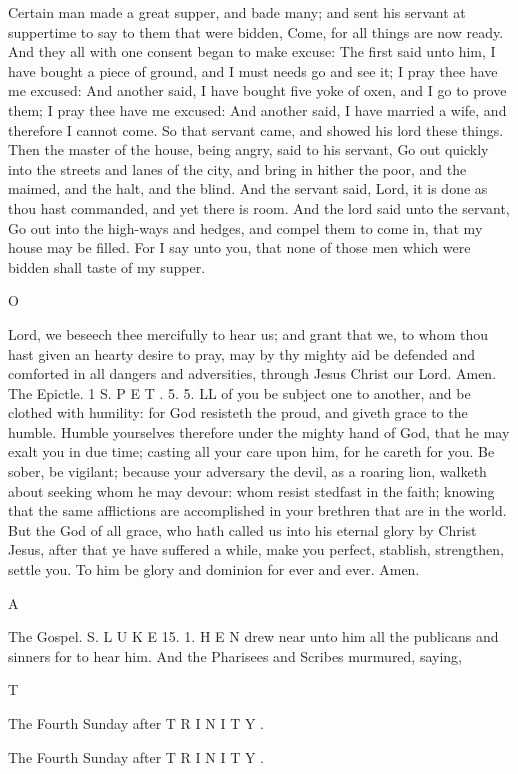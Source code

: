 Certain man made a great supper, and bade many; and sent his servant at suppertime to say to them that were bidden, Come, for all things are now ready. And they all with one consent began to make excuse: The first said unto him, I have bought a piece of ground, and I must needs go and see it; I pray thee have me excused: And another said, I have bought five yoke of oxen, and I go to prove them; I pray thee have me excused: And another said, I have married a wife, and therefore I cannot come. So that servant came, and showed his lord these things. Then the master of the house, being angry, said to his servant, Go out quickly into the streets and lanes of the city, and bring in hither the poor, and the maimed, and the halt, and the blind. And the servant said, Lord, it is done as thou hast commanded, and yet there is room. And the lord said unto the servant, Go out into the high-ways and hedges, and compel them to come in, that my house may be filled. For I say unto you, that none of those men which were bidden shall taste of my supper.

O

Lord, we beseech thee mercifully to hear us; and grant that we, to whom thou hast given an hearty desire to pray, may by thy mighty aid be defended and comforted in all dangers and adversities, through Jesus Christ our Lord. Amen. The Epictle. 1 S. P E T . 5. 5. LL of you be subject one to another, and be clothed with humility: for God resisteth the proud, and giveth grace to the humble. Humble yourselves therefore under the mighty hand of God, that he may exalt you in due time; casting all your care upon him, for he careth for you. Be sober, be vigilant; because your adversary the devil, as a roaring lion, walketh about seeking whom he may devour: whom resist stedfast in the faith; knowing that the same afflictions are accomplished in your brethren that are in the world. But the God of all grace, who hath called us into his eternal glory by Christ Jesus, after that ye have suffered a while, make you perfect, stablish, strengthen, settle you. To him be glory and dominion for ever and ever. Amen.

A

The Gospel. S. L U K E 15. 1. H E N drew near unto him all the publicans and sinners for to hear him. And the Pharisees and Scribes murmured, saying,

T

The Fourth Sunday after T R I N I T Y .

The Fourth Sunday after T R I N I T Y .

